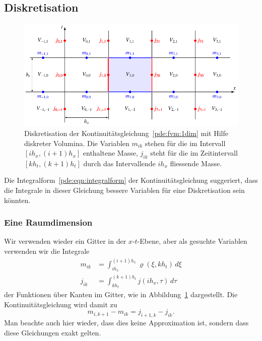 \subsection{Diskretisation}
\begin{figure}
\centering
\includegraphics{chapters/70-pde/images/kont.pdf}
\caption{Diskretisation der Kontinuitätsgleichung~\eqref{pde:fvm:1dim}
mit Hilfe diskreter Volumina. 
Die Variablen $m_{ik}$ stehen für die im Intervall $[ih_x,(i+1)h_x]$
enthaltene Masse, $j_{ik}$ steht für die im Zeitintervall $[kh_t,(k+1)h_t]$
durch das Intervallende $ih_x$ fliessende Masse.
\label{buch:pde:fvdisk}}
\end{figure}
Die Integralform~\eqref{pde:eqn:integralform}
der Kontinuitätsgleichung suggeriert, dass die Integrale
in dieser Gleichung bessere Variablen für eine Diskretisation
sein könnten.

\subsubsection{Eine Raumdimension}
Wir verwenden wieder ein Gitter in der $x$-$t$-Ebene, aber 
als gesuchte Variablen verwenden wir die Integrale
\begin{align*}
m_{ik}
&=
\int_{ih_x}^{(i+1)h_x} \varrho(\xi,kh_t)\,d\xi
\\
j_{ik}
&=
\int_{kh_t}^{(k+1)h_t} j(ih_x,\tau) \,d\tau
\end{align*}
der Funktionen über Kanten im Gitter, wie in Abbildung~\ref{buch:pde:fvdisk}
dargestellt.
Die Kontinuitätsgleichung wird damit zu
\begin{equation}
m_{i,k+1}-m_{ik}
=
j_{i+1,k}-j_{ik}.
\label{pde:fvm:1dim}
\end{equation}
Man beachte auch hier wieder, dass dies keine Approximation ist, sondern
dass diese Gleichungen exakt gelten.

